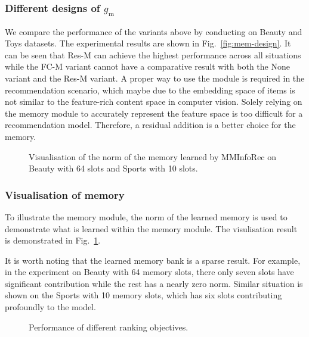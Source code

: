 \documentclass[conference]{IEEEtran}
\begin{document}
\subsubsection{Different designs of $g_\text{m}$}
We compare the performance of the variants above by conducting on Beauty and Toys datasets. The experimental results are shown in Fig.~\ref{fig:mem-design}. It can be seen that Res-M can achieve the highest performance across all situations while the FC-M variant cannot have a comparative result with both the None variant and the Res-M variant. A proper way to use the module is required in the recommendation scenario, which maybe due to the embedding space of items is not similar to the feature-rich content space in computer vision. Solely relying on the memory module to accurately represent the feature space is too difficult for a recommendation model. Therefore, a residual addition is a better choice for the memory.

\begin{figure}[t]
    \centering
    \caption{Visualisation of the norm of the memory learned by MMInfoRec on Beauty with 64 slots and Sports with 10 slots.}
    \label{fig:mem-vis}
\end{figure}

\subsubsection{Visualisation of memory}
To illustrate the memory module, the norm of the learned memory is used to demonstrate what is learned within the memory module. The visulisation result is demonstrated in Fig.~\ref{fig:mem-vis}.

It is worth noting that the learned memory bank is a sparse result. For example, in the experiment on Beauty with 64 memory slots, there only seven slots have significant contribution while the rest has a nearly zero norm. Similar situation is shown on the Sports with 10 memory slots, which has six slots contributing profoundly to the model.

\begin{figure}[t]
    \centering
    \caption{Performance of different ranking objectives.}
\label{fig:nce}
\end{figure}
\end{document}
